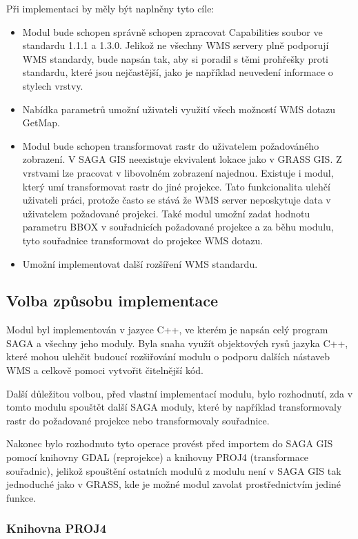 \documentclass[a4paper,12pt]{article}
\begin{document}
Při implementaci by měly být naplněny tyto cíle:
\begin{itemize}
\item Modul bude schopen správně schopen zpracovat Capabilities soubor
  ve standardu 1.1.1 a 1.3.0.  Jelikož ne všechny WMS servery plně
  podporují WMS standardy, bude napsán tak, aby si poradil s těmi
  prohřešky proti standardu, které jsou nejčastější, jako je například
  neuvedení informace o stylech vrstvy.
\item Nabídka parametrů umožní uživateli využití všech možností WMS
  dotazu GetMap.
\item Modul bude schopen transformovat rastr do uživatelem
  požadováného zobrazení. V SAGA GIS neexistuje ekvivalent lokace jako
  v GRASS GIS. Z vrstvami lze pracovat v libovolném zobrazení
  najednou. Existuje i modul, který umí transformovat rastr do jiné
  projekce. Tato funkcionalita ulehčí uživateli práci, protože často
  se stává že WMS server neposkytuje data v uživatelem požadované
  projekci.  Také modul umožní zadat hodnotu parametru BBOX v
  souřadnicích požadované projekce a za běhu modulu, tyto souřadnice
  transformovat do projekce WMS dotazu.
\item Umožní implementovat další rozšíření WMS standardu.
\end{itemize}


\subsection{Volba způsobu implementace}

Modul byl implementován v jazyce C++, ve kterém je napsán celý program
SAGA a všechny jeho moduly.  Byla snaha využít objektových rysů jazyka
C++, které mohou ulehčit budoucí rozšiřování modulu o podporu dalších
nástaveb WMS a celkově pomoci vytvořit čitelnější kód.

Další důležitou volbou, před vlastní implementací modulu, bylo
rozhodnutí, zda v tomto modulu spouštět další SAGA moduly, které by
například transformovaly rastr do požadované projekce nebo
transformovaly souřadnice.

Nakonec bylo rozhodnuto tyto operace provést před importem do SAGA GIS
pomocí knihovny GDAL (reprojekce) a knihovny PROJ4 (transformace
souřadnic), jelikož spouštění ostatních modulů z modulu není v SAGA
GIS tak jednoduché jako v GRASS, kde je možné modul zavolat
prostřednictvím jediné funkce.

\subsubsection{Knihovna PROJ4}
\end{document}
